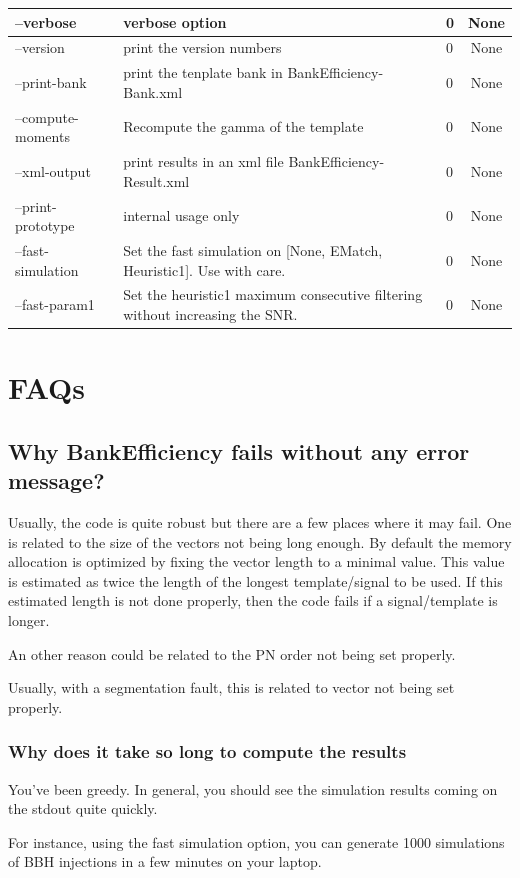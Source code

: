 \documentclass[a4paper,10pt]{article}
\begin{document}
\begin{center}
\begin{tabular}{|l|p{8cm}|p{3cm}|c|}
--verbose &verbose option&0&None\\\hline
--version &print the version numbers&0&None\\\hline
--print-bank &print the tenplate bank in BankEfficiency-Bank.xml &0&None\\\hline
--compute-moments &Recompute the gamma of the template &0&None\\\hline
--xml-output &print results in an xml file BankEfficiency-Result.xml&0&None\\\hline
--print-prototype &internal usage only&0&None\\\hline
--fast-simulation &Set the fast simulation on [None, EMatch, Heuristic1]. Use with care.&0&None\\\hline
--fast-param1 &Set the heuristic1 maximum consecutive filtering without increasing the SNR.&0&None\\\hline
\end{tabular}
\end{center}

\section{FAQs}\label{faqs}
\subsection{Why BankEfficiency fails without any error message? }
Usually, the code is quite robust but there are a few places where it may fail. One is related to the size of the vectors not being long enough. By default the memory allocation is optimized by fixing the vector length to a minimal value. This value is estimated as twice the length of the longest template/signal to be used. If this estimated length is not done properly, then the code fails if a signal/template is longer.

An other reason could be related to the PN order not being set properly.

Usually, with a segmentation fault, this is related to vector not being set properly.

\subsubsection{Why does it take so long to compute the results}
You've been greedy. In general, you should see the simulation results coming on the stdout quite quickly. 

For instance, using the fast simulation option, you can generate 1000 simulations of BBH injections in a few minutes on your laptop. 
\end{document}
